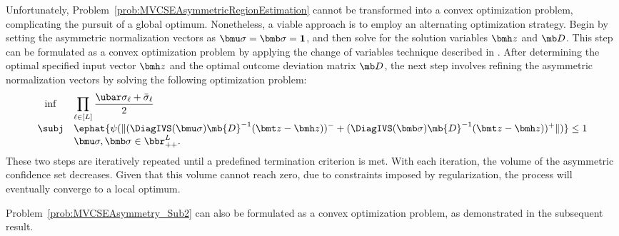 \documentclass[mnsc, nonblindrev]{informswp}
\newcommand{\1}[1]{\mathds{1}{\left(#1\right)}}
\begin{document}
Unfortunately, Problem~\eqref{prob:MVCSEAsymmetricRegionEstimation} cannot be transformed into a convex optimization problem, complicating the pursuit of a global optimum. Nonetheless, a viable approach is to employ an alternating optimization strategy. Begin by setting the asymmetric normalization vectors as $\bmu \sigma=\bmb \sigma=\bm 1$, and then solve for the solution variables $\bmh z$ and $\mb D$. This step can be formulated as a convex optimization problem by applying the change of variables technique described in . After determining the optimal specified input vector $\bmh z$ and the optimal outcome deviation matrix $\mb D$, the next step involves refining the asymmetric normalization vectors by solving the following optimization problem:
\begin{equation}
\label{prob:MVCSEAsymmetry_Sub2}
\begin{array}{cll}
\inf & \displaystyle \prod_{\ell \in [L]} \frac{\ubar \sigma_{\ell} + \bar \sigma_{\ell}}{2} \\
\subj & \displaystyle \ephat{\psi(\|(\DiagIVS(\bmu \sigma) \mb{D}^{-1} (\bmt z - \bmh z))^- + (\DiagIVS(\bmb \sigma) \mb{D}^{-1} (\bmt z - \bmh z ))^+\|)} \leq 1 \\
& \bmu \sigma,\bmb \sigma \in \bbr^L_{++}.  
\end{array} 
\end{equation}
These two steps are iteratively repeated until a predefined termination 
criterion is met. With each iteration, the volume of the asymmetric confidence set decreases. Given that this volume cannot reach zero, due to constraints imposed by regularization, the process will eventually converge to a local optimum.

Problem~\eqref{prob:MVCSEAsymmetry_Sub2} can also be formulated as a convex optimization problem, as demonstrated in the subsequent result.
\end{document}

